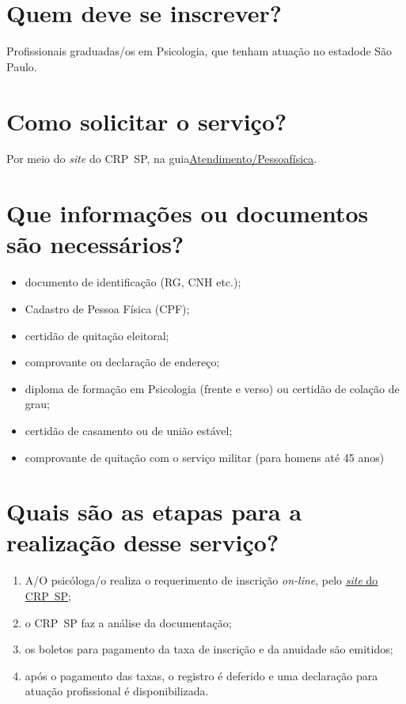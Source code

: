 \section{Quem deve se inscrever?}

Profissionais graduadas/os em Psicologia, que tenham atuação no estadode São Paulo.

\section{Como solicitar o serviço?}

Por meio do \emph{site} do CRP~SP, na guia\href{https://www.crpsp.org/pagina/view/308}{Atendimento/Pessoafísica}.

\section{Que informações ou documentos são necessários?}

\begin{itemize}
  \item  documento de identificação (RG, CNH etc.);
  \item  Cadastro de Pessoa Física (CPF);
  \item  certidão de quitação eleitoral;
  \item  comprovante ou declaração de endereço;
  \item  diploma de formação em Psicologia (frente e verso) ou certidão de  colação de grau;
  \item  certidão de casamento ou de união estável;
  \item  comprovante de quitação com o serviço militar (para homens até 45  anos)
\end{itemize}

\section{Quais são as etapas para a realização desse serviço?}

\begin{enumerate}
  \item  A/O psicóloga/o realiza o requerimento de inscrição \emph{on-line},  pelo \href{https://www.crpsp.org/pagina/view/308}{\emph{site} do  CRP~SP};
  \item  o CRP~SP faz a análise da documentação;
  \item  os boletos para pagamento da taxa de inscrição e da anuidade são  emitidos;
  \item  após o pagamento das taxas, o registro é deferido e uma declaração  para atuação profissional é disponibilizada.
\end{enumerate}


